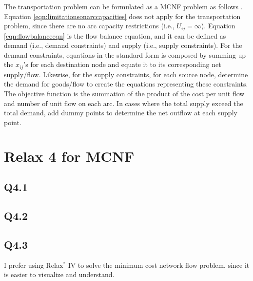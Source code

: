 \documentclass[letter,12pt]{article}
\begin{document}
The transportation problem can be formulated as a MCNF problem as follows \cite[\S8.5, pp. 448--450; Summary, pp. 471--472]{Winston1995}. Equation \ref{eqn:limitationsonarccapacities} does not apply for the transportation problem, since there are no arc capacity restrictions (i.e., $U_{ij} = \infty$). Equation \ref{eqn:flowbalanceeqn} is the flow balance equation, and it can be defined as demand (i.e., demand constraints) and supply (i.e., supply constraints). For the demand constraints, equations in the standard form is composed by summing up the $x_{ij}$'s for each destination node and equate it to its corresponding net supply/flow. Likewise, for the supply constraints, for each source node, determine the demand for goods/flow to create the equations representing these constraints. The objective function is the summation of the product of the cost per unit flow and number of unit flow on each arc. In cases where the total supply exceed the total demand, add dummy points to determine the net outflow at each supply point.

\section{Relax 4 for MCNF}
\label{sec:relax4}



\subsection{Q4.1}
\label{ssec:q4d1}


\subsection{Q4.2}
\label{ssec:q4d2}



\subsection{Q4.3}
\label{ssec:q4d3}


I prefer using Relax$^{\ast}$ IV to solve the minimum cost network flow problem, since it is easier to visualize and understand.


{\linespread{1}


}
\end{document}
